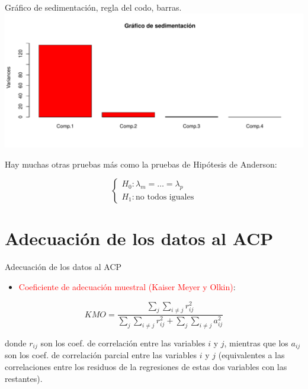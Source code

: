 \documentclass[
  ignorenonframetext,
]{beamer}
\providecommand{\tightlist}{%
  \setlength{\itemsep}{0pt}\setlength{\parskip}{0pt}}
\newcommand\red[1]{\textcolor{red}{#1}}
\begin{document}
\begin{frame}{Gráfico de sedimentación, regla del codo, barras.}
\label{gruxe1fico-de-sedimentaciuxf3n-regla-del-codo-barras.}
\includegraphics{AnalisisComponentesPrincipales_fusion_files/figure-beamer/screeplotbar-1.pdf}

Hay muchas otras pruebas más como la pruebas de Hipótesis de Anderson:

\[\left\{ \begin{array}{l}
H_0: \lambda_m=\ldots=\lambda_p\\ H_1: \mbox{no todos
iguales}\end{array}\right.\]
\end{frame}

\section{Adecuación de los datos al
ACP}\label{adecuaciuxf3n-de-los-datos-al-acp}

\begin{frame}{Adecuación de los datos al ACP}
\label{adecuaciuxf3n-de-los-datos-al-acp-1}
\begin{itemize}
\tightlist
\item
  \red{Coeficiente de adecuación muestral (Kaiser Meyer y Olkin)}:
\end{itemize}

\[KMO=\frac{\sum_j \sum_{i\not =j} r_{i j}^2}{\sum_j \sum_{i\not =j} r^2_{i j}+
\sum_j \sum_{i\not =j} a^2_{i j}}\]

donde \(r_{i j}\) son los coef. de correlación entre las variables \(i\)
y \(j\), mientras que los \(a_{i j}\) son los coef. de correlación
parcial entre las variables \(i\) y \(j\) (equivalentes a las
correlaciones entre los residuos de la regresiones de estas dos
variables con las restantes).
\end{frame}
\end{document}
